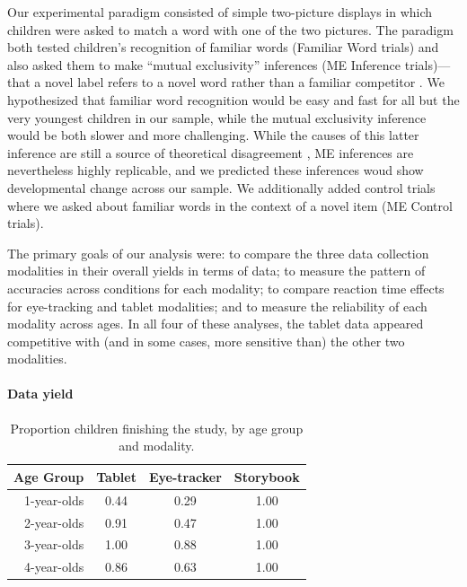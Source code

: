 \documentclass[man,noapacite]{apa2}
\begin{document}
Our experimental paradigm consisted of simple two-picture displays in which children were asked to match a word with one of the two pictures. The paradigm both tested children's recognition of familiar words (Familiar Word trials) and also asked them to make ``mutual exclusivity''  inferences  (ME Inference trials)---that a novel label refers to a novel word rather than a familiar competitor \cite{markman1988}. We hypothesized that familiar word recognition would be easy and fast for all but the very youngest children in our sample, while the mutual exclusivity inference would be both slower and more challenging. While the causes of this latter inference are still a source of theoretical disagreement \cite{markman2003,diesendruck2001,frank2009,bion2013}, ME inferences are nevertheless highly replicable, and we predicted these inferences woud show developmental change across our sample. We additionally added control trials where we asked about familiar words in the context of a novel item (ME Control trials).

The primary goals of our analysis were: to compare the three data collection modalities in their overall yields in terms of data; to measure the pattern of accuracies across conditions for each modality; to compare reaction time effects for eye-tracking and tablet modalities; and to measure the reliability of each modality across ages. In all four of these analyses, the tablet data appeared competitive with (and in some cases, more sensitive than) the other two modalities. 

\paragraph{Data yield} 

\begin{table}[t]
\centering
\caption{Proportion children finishing the study, by age group and modality.\label{tab:completion}}

\begin{tabular}{rccc}
  \hline
Age Group & Tablet & Eye-tracker & Storybook \\ 
  \hline
1-year-olds & 0.44 & 0.29& 1.00 \\ 
2-year-olds & 0.91 & 0.47 & 1.00\\ 
3-year-olds & 1.00 & 0.88 & 1.00\\ 
4-year-olds & 0.86 & 0.63 & 1.00\\ 
   \hline
\end{tabular}
\end{table}
\end{document}
